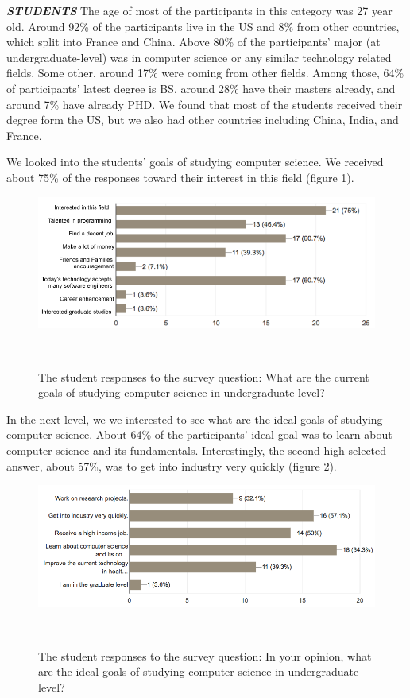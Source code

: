 \documentclass{sigchi}
\begin{document}
\textit{\textbf{STUDENTS}}\newline
The age of most of the participants in this category was 27 year old. Around 92\% of the participants live in the US and 8\% from other countries, which split into France and China.  Above 80\% of the participants' major (at undergraduate-level) was in computer science or any similar technology related fields. Some other, around 17\% were coming from other fields. Among those, 64\% of participants' latest degree is BS, around 28\% have their masters already, and around 7\% have already PHD. We found that most of the students received their degree form the US, but we also had other countries including China, India, and France.

We looked into the students' goals of studying computer science. We received about 75\% of the responses toward their interest in this field (figure 1).

\begin{figure}
\centering
  \includegraphics[width=1.05\columnwidth]{figures/goals_s}
  \caption{The student responses to the survey question: What are the current goals of studying computer science in undergraduate level? }~\label{fig:figure1}
\end{figure}

In the next level, we we interested to see what are the ideal goals of studying computer science. About 64\% of the participants' ideal goal was to learn about computer science and its fundamentals. Interestingly, the second high selected answer, about 57\%, was to get into industry very quickly (figure 2).

\begin{figure}
\centering
  \includegraphics[width=1.05\columnwidth]{figures/ideal_goals_s}
  \caption{The student responses to the survey question: In your opinion, what are the ideal goals of studying computer science in undergraduate level?}~\label{fig:figure2}
\end{figure}
\end{document}
